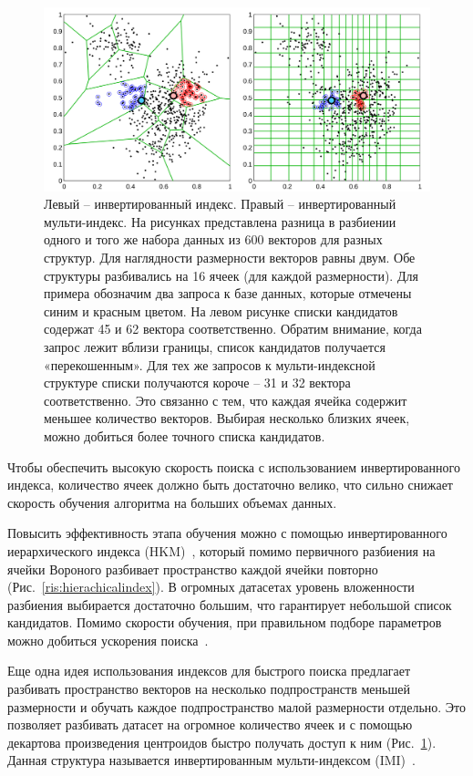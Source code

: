 \begin{figure}[h]
\includegraphics[width=1\linewidth]{Images/MultiIndex.png}
\caption{Левый -- инвертированный индекс. Правый -- инвертированный мульти-индекс. На рисунках представлена разница в разбиении одного и того же набора данных из 600 векторов для разных структур. Для наглядности размерности векторов равны двум. Обе структуры разбивались на 16 ячеек (для каждой размерности). Для примера обозначим два запроса к базе данных, которые отмечены синим и красным цветом. На левом рисунке списки кандидатов содержат 45 и 62 вектора соответственно. Обратим внимание, когда запрос лежит вблизи границы, список кандидатов получается «перекошенным». Для тех же запросов к мульти-индексной структуре списки получаются короче -- 31 и 32 вектора соответственно. Это связанно с тем, что каждая ячейка содержит меньшее количество векторов. Выбирая несколько близких ячеек, можно добиться более точного списка кандидатов.}
\label{ris:multiindex}
\end{figure}

Чтобы обеспечить высокую скорость поиска с использованием инвертированного индекса, количество ячеек должно быть достаточно велико, что сильно снижает скорость обучения алгоритма на больших объемах данных.

Повысить эффективность этапа обучения можно с помощью инвертированного иерархического индекса (HKM)~\cite{11}, который помимо первичного разбиения на ячейки Вороного разбивает пространство каждой ячейки повторно (Рис.~\ref{ris:hierachicalindex}). В огромных датасетах уровень вложенности разбиения выбирается достаточно большим, что гарантирует небольшой список кандидатов. Помимо скорости обучения, при правильном подборе параметров можно добиться ускорения поиска~\cite{11}.

Еще одна идея использования индексов для быстрого поиска предлагает разбивать пространство векторов на несколько подпространств меньшей размерности и обучать каждое подпространство малой размерности отдельно. Это позволяет разбивать датасет на огромное количество ячеек и с помощью декартова произведения центроидов быстро получать доступ к ним (Рис.~\ref{ris:multiindex}). Данная структура называется инвертированным мульти-индексом (IMI)~\cite{3}.

